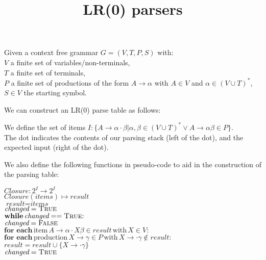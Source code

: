 \documentclass{article}
\title{\textbf{LR(0) parsers}}
\date{}
\begin{document}
	\maketitle
	
	Given a context free grammar $G = (V, T, P, S)$ with:\\
	$V$ a finite set of variables/non-terminals,\\
	$T$ a finite set of terminals,\\
	$P$ a finite set of productions of the form $A \rightarrow \alpha$ with $A \in V$ and $\alpha \in (V \cup T)^*$,\\
	$S \in V$ the starting symbol.
	
	We can construct an LR(0) parse table as follows:
	
	We define the set of items $I : \{A \rightarrow \alpha \cdot \beta | \alpha, \beta \in (V \cup T)^* \vee A \rightarrow \alpha \beta \in P \}$.\\
	The dot indicates the contents of our parsing stack (left of the dot), and the expected input (right of the dot).
	
	We also define the following functions in pseudo-code to aid in the construction of the parsing table:
	
	$\textit{Closure}: 2^I \rightarrow 2^I$\\
	$\textit{Closure}(\textit{items}) \mapsto \textit{result}$\\
	\-\hspace{1em} $\textit{result} = \textit{items}$\\
	\-\hspace{1em} $\textit{changed} = \textsc{True}$\\
	\-\hspace{1em} $\textbf{while} \, \textit{changed} == \textsc{True} \textrm{:}$\\
	\-\hspace{2em} $\textit{changed} = \textsc{False}$\\
	\-\hspace{2em} $\textbf{for each} \, \textrm{item} \, A \rightarrow \alpha \cdot X \beta \in \textit{result} \, \textrm{with} \, X \in V \textrm{:}$\\
	\-\hspace{3em} $\textbf{for each} \, \textrm{production} \, X \rightarrow \gamma \in P \, \textrm{with} \, X \rightarrow \cdot \gamma \notin \textit{result} \textrm{:}$\\
	\-\hspace{4em} $\textit{result} = \textit{result} \cup \{X \rightarrow \cdot \gamma\}$\\
	\-\hspace{4em} $\textit{changed} = \textsc{True}$
	
\end{document}
